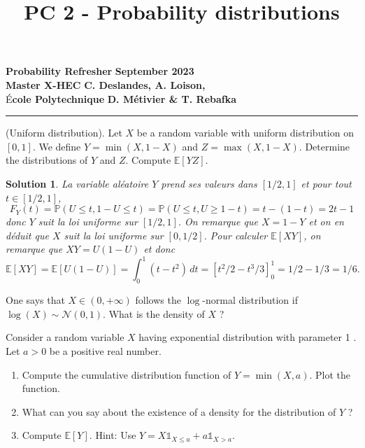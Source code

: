 \documentclass{article}
\title{PC 2 - Probability distributions}
\author{}
\date{}
\newtheorem{solution}{Solution}
\begin{document}
\begin{flushleft}
  \textbf{Probability Refresher} \hfill \textbf{September 2023} \\
  \textbf{Master X-HEC} \hfill \textbf{C. Deslandes, A. Loison,} \\
  É\textbf{cole Polytechnique} \hfill \textbf{D. Métivier \& T. Rebafka}
\end{flushleft}

{\let\newpage\relax\maketitle}
\vspace{-1.3cm}
\hrule

\vspace{0.5cm}

\begin{Exercise} (Uniform distribution). Let $X$ be a random variable with uniform distribution on $[0,1]$. We define $Y=\min (X, 1-X)$ and $Z=\max (X, 1-X)$. Determine the distributions of $Y$ and $Z$. Compute $\mathbb{E}[Y Z]$.
\end{Exercise}

\begin{solution}
  La variable al\'{e}atoire $Y$ prend ses valeurs dans $[1/2,1]$ et pour tout $t\in[1/2,1]$,
  \[
    F_Y(t) = \mathbb{P}(U\leq t,1-U\leq t) = \mathbb{P}(U\leq t,U\geq 1-t)
    = t - (1-t) = 2t-1
  \]
  donc $Y$ suit la loi uniforme sur $[1/2,1]$. On remarque que $X = 1-Y$ et on en
  d\'{e}duit que $X$ suit la loi uniforme sur $[0,1/2]$. Pour calculer
  $\mathbb{E}[XY]$, on remarque que $XY = U(1-U)$ et donc
  \[
    \mathbb{E}[XY]
    = \mathbb{E}[U(1-U)]
    = \int_0^{1}\!(t-t^2)\,dt
      = [t^2/2-t^3/3]_0^{1}
    = 1/2-1/3=1/6.
  \]
\end{solution}

\begin{Exercise} One says that $X \in(0,+\infty)$ follows the $\log$-normal distribution if $\log (X) \sim \mathcal{N}(0,1)$. What is the density of $X$ ?

\end{Exercise} \begin{Exercise} Consider a random variable $X$ having exponential distribution with parameter 1 . Let $a>0$ be a positive real number.

  \begin{enumerate}
    \item Compute the cumulative distribution function of $Y=\min (X, a)$. Plot the
          function.

    \item What can you say about the existence of a density for the distribution of $Y$ ?

    \item Compute $\mathbb{E}[Y]$. Hint: Use $Y=X \mathbb{1}_{X \leq a}+a
            \mathbb{1}_{X>a}$.

  \end{enumerate}

\end{Exercise}
\end{document}
